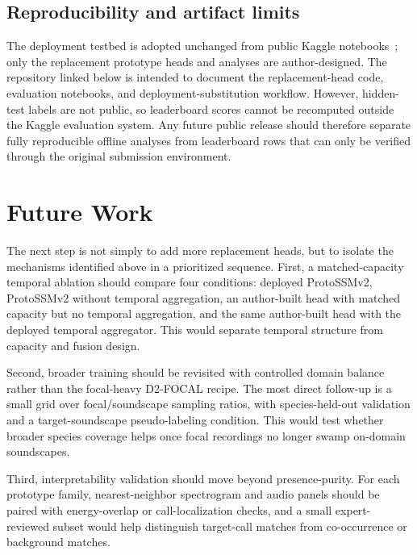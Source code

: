 \documentclass{ceurart}
\begin{document}
\subsection{Reproducibility and artifact limits}

The deployment testbed is adopted unchanged from public Kaggle notebooks~\cite{protossmv2}; only the replacement prototype heads and analyses are author-designed.
The repository linked below is intended to document the replacement-head code, evaluation notebooks, and deployment-substitution workflow.
However, hidden-test labels are not public, so leaderboard scores cannot be recomputed outside the Kaggle evaluation system.
Any future public release should therefore separate fully reproducible offline analyses from leaderboard rows that can only be verified through the original submission environment.


\section{Future Work}
\label{sec:future}

The next step is not simply to add more replacement heads, but to isolate the mechanisms identified above in a prioritized sequence.
First, a matched-capacity temporal ablation should compare four conditions: deployed ProtoSSMv2, ProtoSSMv2 without temporal aggregation, an author-built head with matched capacity but no temporal aggregation, and the same author-built head with the deployed temporal aggregator.
This would separate temporal structure from capacity and fusion design.

Second, broader training should be revisited with controlled domain balance rather than the focal-heavy D2-FOCAL recipe.
The most direct follow-up is a small grid over focal/soundscape sampling ratios, with species-held-out validation and a target-soundscape pseudo-labeling condition.
This would test whether broader species coverage helps once focal recordings no longer swamp on-domain soundscapes.

Third, interpretability validation should move beyond presence-purity.
For each prototype family, nearest-neighbor spectrogram and audio panels should be paired with energy-overlap or call-localization checks, and a small expert-reviewed subset would help distinguish target-call matches from co-occurrence or background matches.
\end{document}
